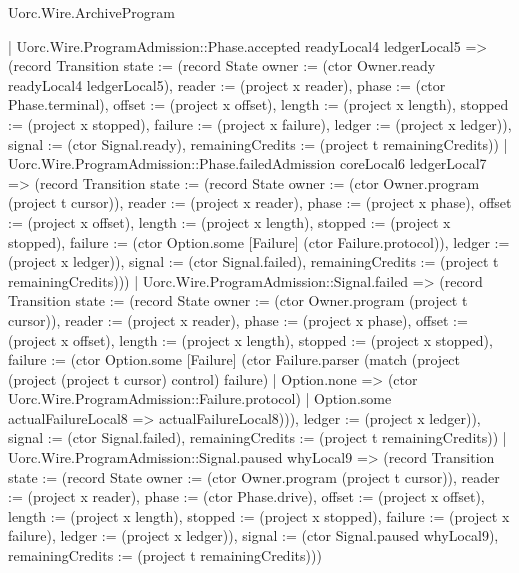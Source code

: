 \begin{lexlean}{Uorc.Wire.ArchiveProgram}
\begin{semanticmodule}
{      | Uorc.Wire.ProgramAdmission::Phase.accepted readyLocal4 ledgerLocal5 => (record Transition {state := (record State {owner := (ctor Owner.ready readyLocal4 ledgerLocal5), reader := (project x reader), phase := (ctor Phase.terminal), offset := (project x offset), length := (project x length), stopped := (project x stopped), failure := (project x failure), ledger := (project x ledger)}), signal := (ctor Signal.ready), remainingCredits := (project t remainingCredits)})
      | Uorc.Wire.ProgramAdmission::Phase.failedAdmission coreLocal6 ledgerLocal7 => (record Transition {state := (record State {owner := (ctor Owner.program (project t cursor)), reader := (project x reader), phase := (project x phase), offset := (project x offset), length := (project x length), stopped := (project x stopped), failure := (ctor Option.some [Failure] (ctor Failure.protocol)), ledger := (project x ledger)}), signal := (ctor Signal.failed), remainingCredits := (project t remainingCredits)}))
    | Uorc.Wire.ProgramAdmission::Signal.failed => (record Transition {state := (record State {owner := (ctor Owner.program (project t cursor)), reader := (project x reader), phase := (project x phase), offset := (project x offset), length := (project x length), stopped := (project x stopped), failure := (ctor Option.some [Failure] (ctor Failure.parser (match (project (project (project t cursor) control) failure)
      | Option.none => (ctor Uorc.Wire.ProgramAdmission::Failure.protocol)
      | Option.some actualFailureLocal8 => actualFailureLocal8))), ledger := (project x ledger)}), signal := (ctor Signal.failed), remainingCredits := (project t remainingCredits)})
    | Uorc.Wire.ProgramAdmission::Signal.paused whyLocal9 => (record Transition {state := (record State {owner := (ctor Owner.program (project t cursor)), reader := (project x reader), phase := (ctor Phase.drive), offset := (project x offset), length := (project x length), stopped := (project x stopped), failure := (project x failure), ledger := (project x ledger)}), signal := (ctor Signal.paused whyLocal9), remainingCredits := (project t remainingCredits)}))
}


\end{semanticmodule}
\end{lexlean}
